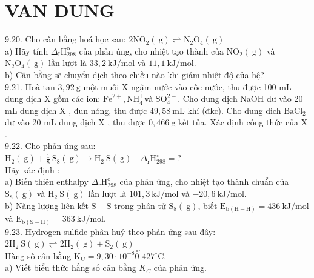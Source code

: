\documentclass[10pt]{article}
\begin{document}
\section*{VAN DUNG}
9.20. Cho cân bằng hoá học sau: $2 \mathrm{NO}_{2}(\mathrm{~g}) \rightleftharpoons \mathrm{N}_{2} \mathrm{O}_{4}(\mathrm{~g})$\\
a) Hãy tính $\Delta_{\mathrm{I}} \mathrm{H}_{298}^{\mathrm{o}}$ của phản úng, cho nhiệt tạo thành của $\mathrm{NO}_{2}(\mathrm{~g})$ và $\mathrm{N}_{2} \mathrm{O}_{4}(\mathrm{~g})$ lần lượt là $33,2 \mathrm{~kJ} / \mathrm{mol}$ và $11,1 \mathrm{~kJ} / \mathrm{mol}$.\\
b) Cân bằng sẽ chuyển dịch theo chiều nào khi giảm nhiệt độ của hệ?\\
9.21. Hoà tan $3,92 \mathrm{~g}$ một muối X ngậm nước vào cốc nước, thu được 100 mL dung dịch X gồm các ion: $\mathrm{Fe}^{2+}, \mathrm{NH}_{4}^{+}$và $\mathrm{SO}_{4}^{2-}$. Cho dung dịch NaOH dư vào 20 mL dung dịch X , đun nóng, thu được $49,58 \mathrm{~mL}$ khí (đkc). Cho dung dich $\mathrm{BaCl}_{2}$ dư vào 20 mL dung dịch X , thu được $0,466 \mathrm{~g}$ kết tủa. Xác định công thức của X .\\
9.22. Cho phản úng sau:\\
$\mathrm{H}_{2}(\mathrm{~g})+\frac{1}{8} \mathrm{~S}_{8}(\mathrm{~g}) \longrightarrow \mathrm{H}_{2} \mathrm{~S}(\mathrm{~g}) \quad \Delta_{\mathrm{r}} \mathrm{H}_{298}^{\circ}=?$\\
Hãy xác định :\\
a) Biến thiên enthalpy $\Delta_{\mathrm{r}} \mathrm{H}_{298}^{\mathrm{o}}$ của phản ứng, cho nhiệt tạo thành chuẩn của $\mathrm{S}_{8}(\mathrm{~g})$ và $\mathrm{H}_{2} \mathrm{~S}(\mathrm{~g})$ lần lượt là $101,3 \mathrm{~kJ} / \mathrm{mol}$ và $-20,6 \mathrm{~kJ} / \mathrm{mol}$.\\
b) Năng lượng liên kết $\mathrm{S}-\mathrm{S}$ trong phân tử $\mathrm{S}_{8}(\mathrm{~g})$, biết $\mathrm{E}_{\mathrm{b}(\mathrm{H}-\mathrm{H})}=436 \mathrm{~kJ} / \mathrm{mol}$ và $\mathrm{E}_{\mathrm{b}(\mathrm{S}-\mathrm{H})}=363 \mathrm{~kJ} / \mathrm{mol}$.\\
9.23. Hydrogen sulfide phân huỷ theo phản ứng sau đây:\\
$2 \mathrm{H}_{2} \mathrm{~S}(\mathrm{~g}) \rightleftharpoons 2 \mathrm{H}_{2}(\mathrm{~g})+\mathrm{S}_{2}(\mathrm{~g})$\\
Hà̀ng số cân bằng $\mathrm{K}_{\mathrm{C}}=9,30 \cdot 10^{-8} \stackrel{\circ}{0}^{\circ} 427^{\circ} \mathrm{C}$.\\
a) Viết biểu thức hằng số cân bằng $K_{C}$ của phản ứng.\\
\end{document}
